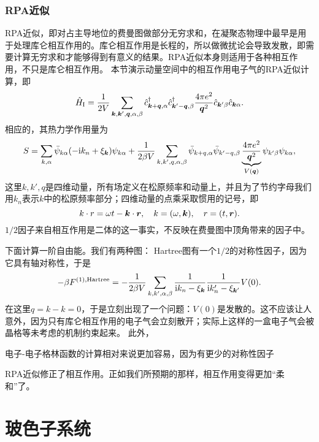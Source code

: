 \documentclass[hyperref, UTF8, a4paper]{ctexart}
\newcommand*{\ii}{\mathrm{i}}
\begin{document}
\subsubsection{RPA近似}

RPA近似，即对占主导地位的费曼图做部分无穷求和，在凝聚态物理中最早是用于处理库仑相互作用的。库仑相互作用是长程的，所以做微扰论会导致发散，即需要计算无穷求和才能够得到有意义的结果。RPA近似本身则适用于各种相互作用，不只是库仑相互作用。
本节演示动量空间中的相互作用电子气的RPA近似计算，即
\begin{equation}
    \hat{H}_\text{I} = \frac{1}{2V} \sum_{\vb*{k}, \vb*{k}', \vb*{q}, \alpha, \beta} \hat{c}^\dagger_{\vb*{k}+\vb*{q}, \alpha} \hat{c}^\dagger_{\vb*{k}'-\vb*{q}, \beta} \frac{4\pi e^2}{\vb*{q}^2} \hat{c}_{\vb*{k}' \beta} \hat{c}_{\vb*{k} \alpha}.
\end{equation}
相应的，其热力学作用量为
\begin{equation}
    S = \sum_{k, \alpha} \bar{\psi}_{k \alpha} (-\ii k_n + \xi_{\vb*{k}}) \psi_{k \alpha} + \frac{1}{2 \beta V} \sum_{k, k', q, \alpha, \beta} \bar{\psi}_{k+q, \alpha} \bar{\psi}_{k'-q, \beta} \underbrace{\frac{4\pi e^2}{\vb*{q}^2}}_{V(\vb*{q})} \psi_{k' \beta} \psi_{k \alpha},
\end{equation}
这里$k, k', q$是四维动量，所有场定义在松原频率和动量上，并且为了节约字母我们用$k_n$表示$k$中的松原频率部分；四维动量的点乘采取惯用的记号，即
\begin{equation}
    k \cdot r = \omega t - \vb*{k} \cdot \vb*{r}, \quad k = (\omega, \vb*{k}), \quad r = (t, \vb*{r}).
\end{equation}
$1/2$因子来自相互作用是二体的这一事实，不反映在费曼图中顶角带来的因子中。

下面计算一阶自由能。我们有两种图：
Hartree图有一个$1/2$的对称性因子，因为它具有轴对称性，于是
\[
    - \beta F^{(1),\text{Hartree}} = - \frac{1}{2 \beta V} \sum_{k, k', \alpha, \beta} \frac{1}{\ii k_n - \xi_{\vb*{k}}} \frac{1}{\ii k'_n - \xi_{\vb*{k}'}} V(0) .
\]
在这里$q=k-k=0$，于是立刻出现了一个问题：$V(0)$是发散的。这不应该让人意外，因为只有库仑相互作用的电子气会立刻散开；实际上这样的一盒电子气会被晶格等未考虑的机制约束起来。
此外，

电子-电子格林函数的计算相对来说更加容易，因为有更少的对称性因子

RPA近似修正了相互作用。正如我们所预期的那样，相互作用变得更加“柔和”了。

\section{玻色子系统}
\end{document}

